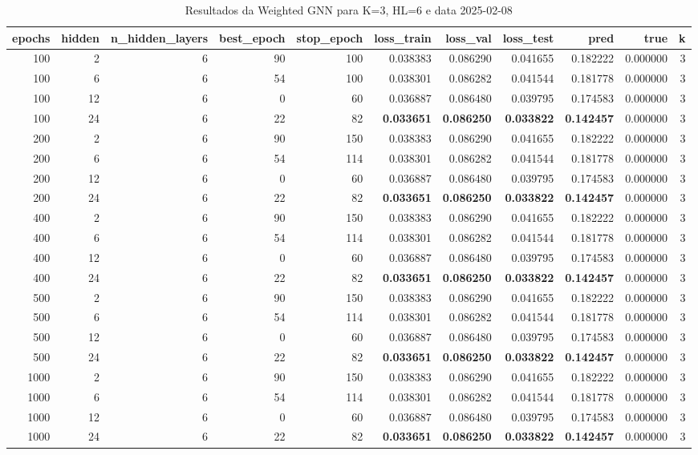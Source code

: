 \begin{table}
\caption{Resultados da Weighted GNN para K=3, HL=6 e data 2025-02-08}
\label{tab:weighted_gnn_results_k3_hl6_d20250208}
\begin{tabular}{rrrrrrrrrrr}
\toprule
epochs & hidden & n\_hidden\_layers & best\_epoch & stop\_epoch & loss\_train & loss\_val & loss\_test & pred & true & k \\
\midrule
100 & 2 & 6 & 90 & 100 & 0.038383 & 0.086290 & 0.041655 & 0.182222 & 0.000000 & 3 \\
100 & 6 & 6 & 54 & 100 & 0.038301 & 0.086282 & 0.041544 & 0.181778 & 0.000000 & 3 \\
100 & 12 & 6 & 0 & 60 & 0.036887 & 0.086480 & 0.039795 & 0.174583 & 0.000000 & 3 \\
100 & 24 & 6 & 22 & 82 & \textbf{0.033651} & \textbf{0.086250} & \textbf{0.033822} & \textbf{0.142457} & 0.000000 & 3 \\
200 & 2 & 6 & 90 & 150 & 0.038383 & 0.086290 & 0.041655 & 0.182222 & 0.000000 & 3 \\
200 & 6 & 6 & 54 & 114 & 0.038301 & 0.086282 & 0.041544 & 0.181778 & 0.000000 & 3 \\
200 & 12 & 6 & 0 & 60 & 0.036887 & 0.086480 & 0.039795 & 0.174583 & 0.000000 & 3 \\
200 & 24 & 6 & 22 & 82 & \textbf{0.033651} & \textbf{0.086250} & \textbf{0.033822} & \textbf{0.142457} & 0.000000 & 3 \\
400 & 2 & 6 & 90 & 150 & 0.038383 & 0.086290 & 0.041655 & 0.182222 & 0.000000 & 3 \\
400 & 6 & 6 & 54 & 114 & 0.038301 & 0.086282 & 0.041544 & 0.181778 & 0.000000 & 3 \\
400 & 12 & 6 & 0 & 60 & 0.036887 & 0.086480 & 0.039795 & 0.174583 & 0.000000 & 3 \\
400 & 24 & 6 & 22 & 82 & \textbf{0.033651} & \textbf{0.086250} & \textbf{0.033822} & \textbf{0.142457} & 0.000000 & 3 \\
500 & 2 & 6 & 90 & 150 & 0.038383 & 0.086290 & 0.041655 & 0.182222 & 0.000000 & 3 \\
500 & 6 & 6 & 54 & 114 & 0.038301 & 0.086282 & 0.041544 & 0.181778 & 0.000000 & 3 \\
500 & 12 & 6 & 0 & 60 & 0.036887 & 0.086480 & 0.039795 & 0.174583 & 0.000000 & 3 \\
500 & 24 & 6 & 22 & 82 & \textbf{0.033651} & \textbf{0.086250} & \textbf{0.033822} & \textbf{0.142457} & 0.000000 & 3 \\
1000 & 2 & 6 & 90 & 150 & 0.038383 & 0.086290 & 0.041655 & 0.182222 & 0.000000 & 3 \\
1000 & 6 & 6 & 54 & 114 & 0.038301 & 0.086282 & 0.041544 & 0.181778 & 0.000000 & 3 \\
1000 & 12 & 6 & 0 & 60 & 0.036887 & 0.086480 & 0.039795 & 0.174583 & 0.000000 & 3 \\
1000 & 24 & 6 & 22 & 82 & \textbf{0.033651} & \textbf{0.086250} & \textbf{0.033822} & \textbf{0.142457} & 0.000000 & 3 \\
\bottomrule
\end{tabular}
\end{table}


